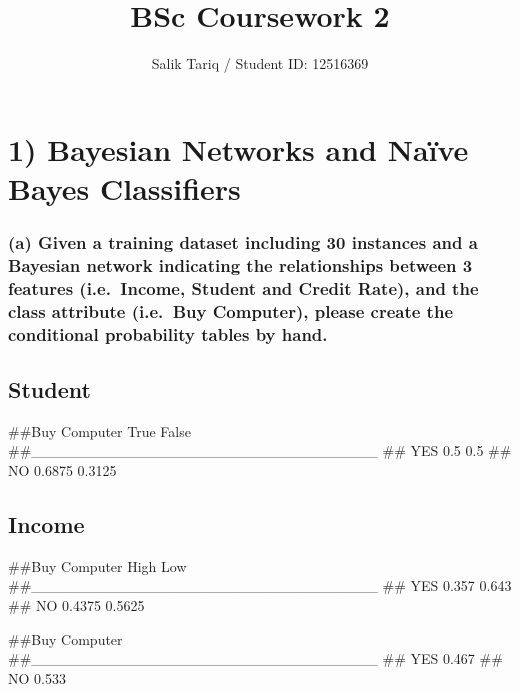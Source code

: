 \documentclass[]{article}
\title{BSc Coursework 2}
\author{Salik Tariq / Student ID: 12516369}
\date{}
\begin{document}
\maketitle

\hypertarget{bayesian-networks-and-nauxefve-bayes-classifiers}{%
\section{1) Bayesian Networks and Naïve Bayes
Classifiers}\label{bayesian-networks-and-nauxefve-bayes-classifiers}}

\hypertarget{a-given-a-training-dataset-including-30-instances-and-a-bayesian-network-indicating-the-relationships-between-3-features-i.e.-income-student-and-credit-rate-and-the-class-attribute-i.e.-buy-computer-please-create-the-conditional-probability-tables-by-hand.}{%
\subsubsection{(a) Given a training dataset including 30 instances and a
Bayesian network indicating the relationships between 3 features
(i.e.~Income, Student and Credit Rate), and the class attribute
(i.e.~Buy Computer), please create the conditional probability tables by
hand.}\label{a-given-a-training-dataset-including-30-instances-and-a-bayesian-network-indicating-the-relationships-between-3-features-i.e.-income-student-and-credit-rate-and-the-class-attribute-i.e.-buy-computer-please-create-the-conditional-probability-tables-by-hand.}}

\hypertarget{student}{%
\subsection{Student}\label{student}}

\#\#Buy Computer \textbar{} True False
\#\#\_\_\_\_\_\_\_\_\_\_\_\_\_\_\_\_\_\_\_\_\_\_\_\_\_\_\_\_\_\_\_\_\_
\#\# YES \textbar{} 0.5 0.5 \#\# NO \textbar{} 0.6875 0.3125

\hypertarget{income}{%
\subsection{Income}\label{income}}

\#\#Buy Computer \textbar{} High Low
\#\#\_\_\_\_\_\_\_\_\_\_\_\_\_\_\_\_\_\_\_\_\_\_\_\_\_\_\_\_\_\_\_\_\_
\#\# YES \textbar{} 0.357 0.643 \#\# NO \textbar{} 0.4375 0.5625

\#\#Buy Computer\\
\#\#\_\_\_\_\_\_\_\_\_\_\_\_\_\_\_\_\_\_\_\_\_\_\_\_\_\_\_\_\_\_\_\_\_
\#\# YES \textbar{} 0.467 \#\# NO \textbar{} 0.533
\end{document}
